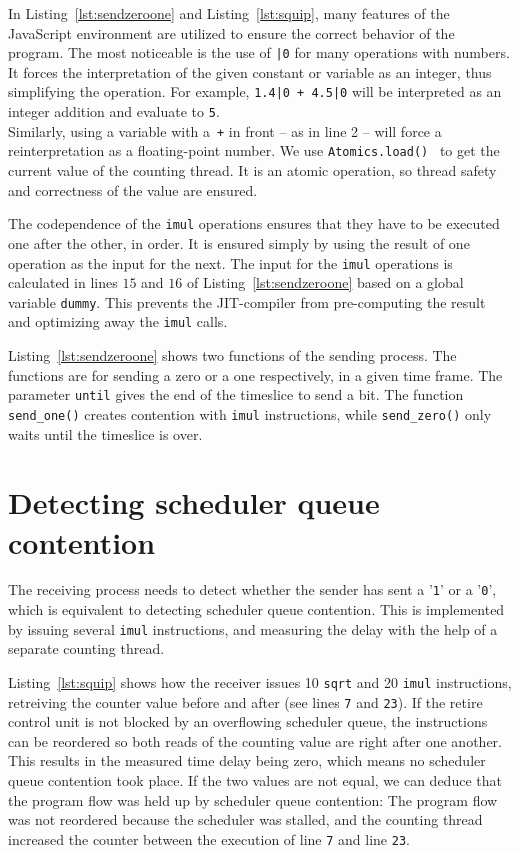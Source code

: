 \documentclass[11pt,
  titlepage=false,
  parskip=half,      %
]{scrreprt}
\begin{document}
In Listing~\ref{lst:sendzeroone} and Listing~\ref{lst:squip}, many features of the JavaScript environment are utilized to ensure the correct behavior of the program.
The most noticeable is the use of \texttt{|0} for many operations with numbers.
It forces the interpretation of the given constant or variable as an integer, thus simplifying the operation.
For example, \texttt{1.4|0 + 4.5|0} will be interpreted as an integer addition and evaluate to \texttt{5}. \\
Similarly, using a variable with a~\texttt{+} in front -- as in line 2 -- will force a reinterpretation as a floating-point number.
We use \texttt{Atomics.load()}~\cite{atomicsload} to get the current value of the counting thread.
It is an atomic operation, so thread safety and correctness of the value are ensured.

The codependence of the \texttt{imul} operations ensures that they have to be executed one after the other, in order.
It is ensured simply by using the result of one operation as the input for the next.
The input for the \texttt{imul} operations is calculated in lines $15$ and $16$ of Listing~\ref{lst:sendzeroone} based on a global variable \texttt{dummy}.
This prevents the JIT-compiler from pre-computing the result and optimizing away the \texttt{imul} calls.

Listing~\ref{lst:sendzeroone} shows two functions of the sending process.
The functions are for sending a zero or a one respectively, in a given time frame.
The parameter \texttt{until} gives the end of the timeslice to send a bit.
The function \texttt{send\_one()} creates contention with \texttt{imul} instructions,
while \texttt{send\_zero()} only waits until the timeslice is over.

\section{Detecting scheduler queue contention}
\label{sec:detect-sqc}
The receiving process needs to detect whether the sender has sent a '\texttt{1}' or a '\texttt{0}',
which is equivalent to detecting scheduler queue contention.
This is implemented by issuing several \texttt{imul} instructions,
and measuring the delay with the help of a separate counting thread.

Listing~\ref{lst:squip} shows how the receiver issues 10 \texttt{sqrt} and 20 \texttt{imul} instructions,
retreiving the counter value before and after (see lines \texttt{7} and \texttt{23}).
If the retire control unit is not blocked by an overflowing scheduler queue,
the instructions can be reordered so both reads of the counting value are right after one another.
This results in the measured time delay being zero, which means no scheduler queue contention took place.
If the two values are not equal, we can deduce that the program flow was held up by scheduler queue contention:
The program flow was not reordered because the scheduler was stalled, and the counting thread increased the counter
between the execution of line \texttt{7} and line \texttt{23}.
\end{document}
